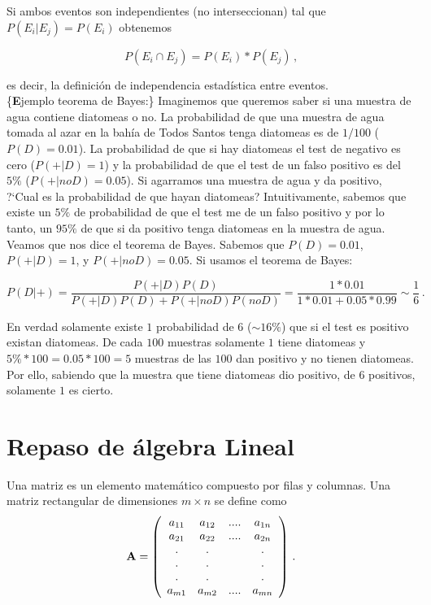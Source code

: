 \documentclass[
]{agujournal2019}
\begin{document}
Si ambos eventos son independientes (no interseccionan) tal que
\(P(E_i|E_j)=P(E_i)\) obtenemos

\[P(E_i\cap E_j)=P(E_i)*P(E_j)\,,\]

es decir, la definición de independencia estadística entre eventos.\\

\{\textbf Ejemplo teorema de Bayes:\} Imaginemos que queremos saber si
una muestra de agua contiene diatomeas o no. La probabilidad de que una
muestra de agua tomada al azar en la bahía de Todos Santos tenga
diatomeas es de \(1/100\) (\(P(D)=0.01\)). La probabilidad de que si hay
diatomeas el test de negativo es cero (\(P(+|D)=1\)) y la probabilidad
de que el test de un falso positivo es del \(5\%\) (\(P(+|noD)=0.05\)).
Si agarramos una muestra de agua y da positivo, ?{}`Cual es la
probabilidad de que hayan diatomeas? Intuitivamente, sabemos que existe
un \(5\%\) de probabilidad de que el test me de un falso positivo y por
lo tanto, un \(95\%\) de que si da positivo tenga diatomeas en la
muestra de agua. Veamos que nos dice el teorema de Bayes. Sabemos que
\(P(D)=0.01\), \(P(+|D)=1\), y \(P(+|noD)=0.05\). Si usamos el teorema
de Bayes:

\[ P(D|+)=\frac{P(+|D)P(D)}{P(+|D)P(D) + P(+|noD)P(noD)}=
          \frac{1*0.01}{1*0.01+0.05*0.99}\sim\frac{1}{6}\,.\]

En verdad solamente existe \(1\) probabilidad de \(6\) (\(\sim16\%\))
que si el test es positivo existan diatomeas. De cada \(100\) muestras
solamente \(1\) tiene diatomeas y \(5\%*100=0.05*100=5\) muestras de las
\(100\) dan positivo y no tienen diatomeas. Por ello, sabiendo que la
muestra que tiene diatomeas dio positivo, de \(6\) positivos, solamente
\(1\) es cierto.




\hypertarget{repaso-de-uxe1lgebra-lineal}{%
\section{Repaso de álgebra Lineal}\label{repaso-de-uxe1lgebra-lineal}}

Una matriz es un elemento matemático compuesto por filas y columnas. Una
matriz rectangular de dimensiones \(m\times n\) se define como
\[{\textbf A}=\left(\begin{array}{cccc}
  a_{11} & a_{12} & .... & a_{1n}\\
  a_{21} & a_{22} & .... & a_{2n}\\
    .    &   .    &      &   . \\
    .    &   .    &      &   . \\
    .    &   .    &      &   . \\
  a_{m1} & a_{m2} & .... & a_{mn}\\
\end{array}
  \right)
\,.\]
\end{document}
